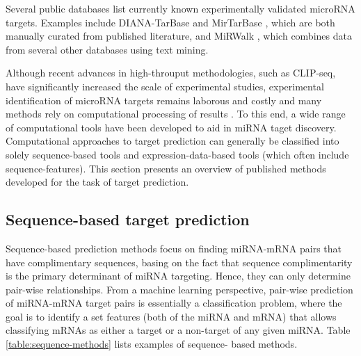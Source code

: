 Several public databases list currently known experimentally validated
microRNA targets. Examples include DIANA-TarBase \citep{Vlachos2015} and
MirTarBase \citep{Chou2016}, which are both manually curated from published
literature, and MiRWalk \citep{Dweep2015}, which combines data from several
other databases using text mining.

Although recent advances in high-throuput methodologies, such as CLIP-seq,
have significantly increased the scale of experimental studies, experimental
identification of microRNA targets remains laborous and costly and many
methods rely on computational processing of results \citep{Vlachos2015}. To
this end, a wide range of computational tools have been developed to aid in
miRNA taget discovery. Computational approaches to target prediction
can generally be classified into solely sequence-based tools and
expression-data-based tools (which often include sequence-features).
This section presents an overview of published methods developed for the
task of target prediction.





\subsection{Sequence-based target prediction}

Sequence-based prediction methods focus on finding miRNA-mRNA pairs that
have complimentary sequences, basing on the fact that sequence complimentarity
is the primary determinant of miRNA targeting. Hence, they can
only determine pair-wise relationships. From a machine learning perspective,
pair-wise prediction of miRNA-mRNA target pairs is essentially a classification
problem, where the goal is to identify a set features (both of the miRNA and
mRNA) that allows classifying mRNAs as either a target or a non-target of any
given miRNA. Table \ref{table:sequence-methods} lists examples of sequence-
based methods.

